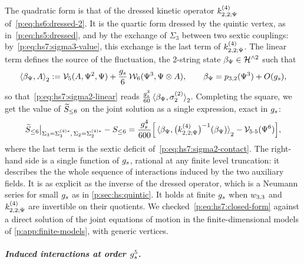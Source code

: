 The quadratic form is that of the dressed kinetic operator $\kin{2}{\Psi}{4}$ of~\eqref{p:eq:hs6:dressed-2}.
It is the quartic form dressed by the quintic vertex, as in~\eqref{p:eq:hs5:dressed}, and by the exchange of $\Sigma_3$ between two sextic couplings: by~\eqref{p:eq:hs7:sigma3-value}, this exchange is the last term of $\kin{2}{\Psi}{4}$.
The linear term defines the source of the fluctuation, the $2$-string state $\beta_\Psi \in \Hn{2}$ such that
\begin{equation}
  \label{p:eq:hs7:source-2}
  \pair[2]{\beta_\Psi}{A}
    := \vertex{5}(A, \Psi^2, \Psi) + \frac{\gs}{6} \, \dvertex{6}(\Psi^3, \Psi \otimes A),
  \qquad
  \beta_\Psi
    = \sprod{3}{2}(\Psi^3) + O(\gs),
\end{equation}
so that~\eqref{p:eq:hs7:sigma2-linear} reads $\tfrac{\gs^3}{60} \pair[2]{\beta_\Psi}{\sigma_2^{(2)}}$.
Completing the square, we get the value of $\caction[\le 6]$ on the joint solution as a single expression, exact in $\gs$:
\begin{equation}
  \label{p:eq:hs7:closed-form}
  \caction[\le 6] \big|_{\Sigma_3 = \Sigma_3^{(4)*}, \, \Sigma_2 = \Sigma_2^{(4)*}} - S_{\le 6}
    = \frac{\gs^4}{600} \Big[ \pair[2]{\beta_\Psi}{\big( \kin{2}{\Psi}{4} \big)^{-1}(\beta_\Psi)} - \vertex{5 \cdot 5}(\Psi^6) \Big],
\end{equation}
where the last term is the sextic deficit of~\eqref{p:eq:hs7:sigma2-contact}.
The right-hand side is a single function of $\gs$, rational at any finite level truncation: it describes the the whole sequence of interactions induced by the two auxiliary fields.
It is as explicit as the inverse of the dressed operator, which is a Neumann series for small $\gs$ as in \cref{p:sec:hs:quintic}.
It holds at finite $\gs$ when $\wprod{3}{3}$ and $\kin{2}{\Psi}{4}$ are invertible on their quotients.
We checked~\eqref{p:eq:hs7:closed-form} against a direct solution of the joint equations of motion in the finite-dimensional models of \cref{p:app:finite-models}, with generic vertices.

\subparagraph{Induced interactions at order $\gs^5$.}

